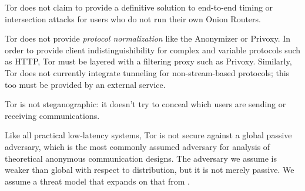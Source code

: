 \documentclass[times,10pt,twocolumn]{article}
\begin{document}
Tor does not claim to provide a definitive solution to end-to-end
timing or intersection attacks for users who do not run their own
Onion Routers.

Tor does not provide \emph{protocol normalization} like the Anonymizer or
Privoxy.  In order to provide client indistinguishibility for
complex and variable protocols such as HTTP, Tor must be layered with
a filtering proxy such as Privoxy.  Similarly, Tor does not currently
integrate tunneling for non-stream-based protocols; this too must be
provided by an external service.

Tor is not steganographic: it doesn't try to conceal which users are
sending or receiving communications.


\label{subsec:adversary-model}

Like all practical low-latency systems, Tor is not secure against a
global passive adversary, which is the most commonly assumed adversary
for analysis of theoretical anonymous communication designs. The adversary
we assume
is weaker than global with respect to distribution, but it is not
merely passive.
We assume a threat model that expands on that from \cite{or-pet00}.
\end{document}
